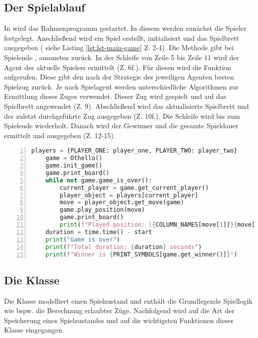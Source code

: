 \subsection{Der Spielablauf}
In  wird das Rahmenprogramm gestartet. In diesem werden zunächst die Spieler festgelegt. Anschließend wird ein Spiel erstellt, initialisiert und das Spielbrett ausgegeben ( siehe Listing \ref{lst:lst-main-game} Z. 2-4). Die Methode  gibt bei Spielende , ansonsten  zurück. In der Schleife von Zeile 5 bis Zeile 11 wird der Agent des aktuelle Spielers ermittelt (Z. 6f.). Für diesen wird die Funktion  aufgerufen. Diese gibt den nach der Strategie des jeweiligen Agenten besten Spielzug zurück. Je nach Spielagent werden unterschiedliche Algorithmen zur Ermittlung dieses Zuges verwendet. Dieser Zug wird gespielt und auf das Spielbrett angewendet (Z. 9). Abschließend wird das aktualisierte Spielbrett und der zuletzt durchgeführte Zug ausgegeben (Z. 10f.). Die Schleife wird bis zum Spielende wiederholt. Danach wird der Gewinner und die gesamte Spieldauer ermittelt und ausgegeben (Z. 12-15).
\begin{lstlisting}[caption = {Spielablauf in \mxZitat{main-game.py}}, language = python, captionpos = t , numbers=left, label={lst:lst-main-game}]
    players = {PLAYER_ONE: player_one, PLAYER_TWO: player_two}
    game = Othello()
    game.init_game()
    game.print_board()
    while not game.game_is_over():
        current_player = game.get_current_player()
        player_object = players[current_player]
        move = player_object.get_move(game)
        game.play_position(move)
        game.print_board()
        print(f"Played position: ({COLUMN_NAMES[move[1]]}{move[0] + 1})")
    duration = time.time() - start
    print("Game is over")
    print(f"Total duration: {duration} seconds")
    print(f"Winner is {PRINT_SYMBOLS[game.get_winner()]}")
\end{lstlisting}
\subsection{Die Klasse }
\label{ot1}
Die Klasse  modelliert einen Spielzustand und enthält die Grundlegende Spiellogik wie bspw. die Berechnung erlaubter Züge. Nachfolgend wird auf die Art der Speicherung eines Spielzustandes und auf die wichtigsten Funktionen dieser Klasse eingegangen.
